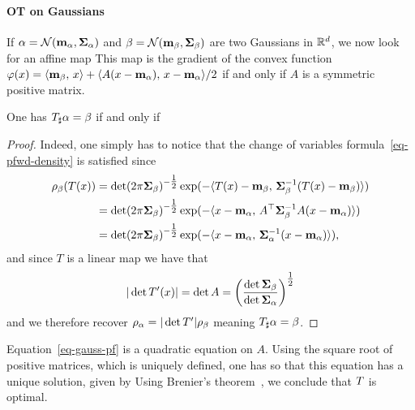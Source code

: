 \paragraph{OT on Gaussians}


If $\alpha = \mathcal{N}(\mathbf{m}_\alpha,\mathbf{\Sigma}_\alpha)$ and $\beta = \mathcal{N}(\mathbf{m}_\beta,\mathbf{\Sigma}_\beta)$ are two Gaussians in $\mathbb{R}^d$, we now look for an affine map
This map is the gradient of the convex function $\varphi(x) = \langle \mathbf{m}_\beta,\,x\rangle + \langle A(x-\mathbf{m}_\alpha),\,x-\mathbf{m}_\alpha\rangle/2$ if and only if $A$ is a symmetric positive matrix. 

\begin{prop}
One has $T_\sharp \alpha=\beta$ if and only if 
\end{prop}
\begin{proof}
Indeed, one simply has to notice that the change of variables formula~\eqref{eq-pfwd-density} is satisfied since
$$
\begin{aligned}\rho_\beta(T(x))&=\det(2\pi\mathbf{\Sigma}_\beta)^{-\tfrac{1}{2}} \exp(-\langle T(x)-\mathbf{m}_\beta,\,\mathbf{\Sigma}_\beta^{-1}(T(x)-\mathbf{m}_\beta)\rangle)\\
&= \det(2\pi\mathbf{\Sigma}_\beta)^{-\tfrac{1}{2}} \exp(-\langle  x-\mathbf{m}_\alpha,\,{A}^\top\mathbf{\Sigma}_\beta^{-1}A(x-\mathbf{m}_\alpha)\rangle) \\
&= \det(2\pi\mathbf{\Sigma}_\beta)^{-\tfrac{1}{2}} \exp(-\langle  x-\mathbf{m}_\alpha,\,\mathbf{\Sigma}_\alpha^{-1}(x-\mathbf{m}_\alpha)\rangle),
\end{aligned}$$
and since $T$ is a linear map we have that 
$$|\det T'(x)|= \det A = \left(\frac{\det\mathbf{\Sigma}_\beta}{\det\mathbf{\Sigma}_\alpha}\right)^{\tfrac{1}{2}}$$
 and we therefore recover $\rho_\alpha=|\det T'| \rho_\beta$ meaning $T_\sharp \alpha = \beta$. 
\end{proof}

Equation~\eqref{eq-gauss-pf} is a quadratic equation on $A$. Using the square root of positive matrices, which is uniquely defined, one has 
so that this equation has a unique solution, given by
Using Brenier's theorem~\cite{Brenier91}, we conclude that $T$ is optimal. 
 
